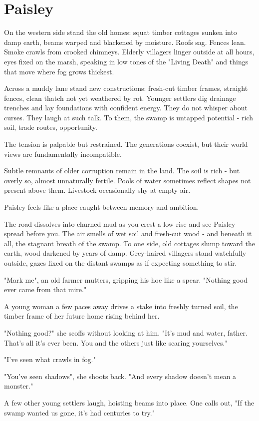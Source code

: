 \chapter*{Paisley}

{\entryfont On the western side stand the old homes: squat timber cottages sunken into damp earth, beams warped and blackened by moisture. Roofs sag. Fences lean. Smoke crawls from crooked chimneys. Elderly villagers linger outside at all hours, eyes fixed on the marsh, speaking in low tones of the "Living Death" and things that move where fog grows thickest.

Across a muddy lane stand new constructions: fresh-cut timber frames, straight fences, clean thatch not yet weathered by rot. Younger settlers dig drainage trenches and lay foundations with confident energy. They do not whisper about curses. They laugh at such talk. To them, the swamp is untapped potential - rich soil, trade routes, opportunity.

The tension is palpable but restrained. The generations coexist, but their world views are fundamentally incompatible.

Subtle remnants of older corruption remain in the land. The soil is rich - but overly so, almost unnaturally fertile. Pools of water sometimes reflect shapes not present above them. Livestock occasionally shy at empty air.

Paisley feels like a place caught between memory and ambition.}
\begin{DndReadAloud}
	The road dissolves into churned mud as you crest a low rise and see Paisley spread before you. The air smells of wet soil and fresh-cut wood - and beneath it all, the stagnant breath of the swamp. To one side, old cottages slump toward the earth, wood darkened by years of damp. Grey-haired villagers stand watchfully outside, gazes fixed on the distant swamps as if expecting something to stir.

	"Mark me", an old farmer mutters, gripping his hoe like a spear. "Nothing good ever came from that mire."

	A young woman a few paces away drives a stake into freshly turned soil, the timber frame of her future home rising behind her.

	"Nothing good?" she scoffs without looking at him. "It's mud and water, father. That's all it's ever been. You and the others just like scaring yourselves."

	"I've seen what crawls in fog."

	"You've seen shadows", she shoots back. "And every shadow doesn't mean a monster."

	A few other young settlers laugh, hoisting beams into place. One calls out, "If the swamp wanted us gone, it's had centuries to try."
\end{DndReadAloud}
